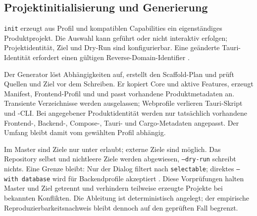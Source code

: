 \subsection{Projektinitialisierung und Generierung}
\label{subsec:projektinitialisierung-generierung}

\texttt{init} erzeugt aus Profil und kompatiblen Capabilities ein eigenständiges
Produktprojekt. Die Auswahl kann geführt oder nicht interaktiv erfolgen;
Projektidentität, Ziel und Dry-Run sind konfigurierbar. Eine geänderte
Tauri-Identität erfordert einen gültigen Reverse-Domain-Identifier
\parencite{kleiveist2026profiles,kleiveist2026tooling}.



Der Generator löst Abhängigkeiten auf, erstellt den Scaffold-Plan und prüft
Quellen und Ziel vor dem Schreiben. Er kopiert Core und aktive Features,
erzeugt Manifest, Frontend-Profil und  und passt vorhandene
Produktmetadaten an. Transiente Verzeichnisse werden ausgelassen; Webprofile
verlieren Tauri-Skript und -CLI.
Bei angegebener Produktidentität werden nur tatsächlich vorhandene Frontend-,
Backend-, Compose-, Tauri- und Cargo-Metadaten angepasst. Der Umfang bleibt
damit vom gewählten Profil abhängig.

Im Master sind Ziele nur unter  erlaubt; externe Ziele sind
möglich. Das Repository selbst und nichtleere Ziele werden abgewiesen,
\texttt{--dry-run} schreibt nichts. Eine Grenze bleibt: Nur der Dialog filtert
nach \texttt{selectable}; direktes \texttt{--with database} wird für
Backendprofile akzeptiert \parencite{kleiveist2026template}.
Diese Vorprüfungen halten Master und Ziel getrennt und verhindern teilweise
erzeugte Projekte bei bekannten Konflikten. Die Ableitung ist deterministisch
angelegt; der empirische Reproduzierbarkeitsnachweis bleibt dennoch auf den
geprüften Fall begrenzt.
